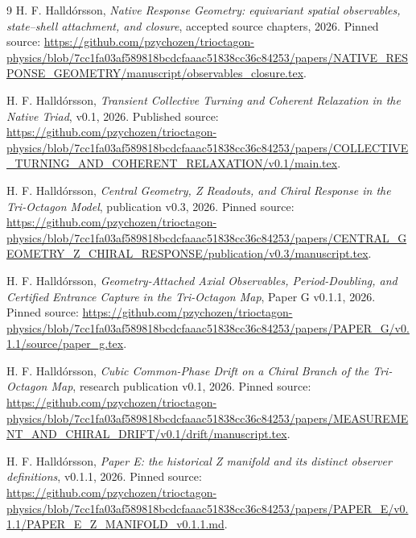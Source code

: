 \documentclass[11pt,a4paper]{article}
\numberwithin{equation}{section}
\theoremstyle{definition}
\theoremstyle{remark}
\begin{document}
\begin{thebibliography}{9}
\small
{}
H. F. Halldórsson, \emph{Native Response Geometry: equivariant spatial
observables, state--shell attachment, and closure}, accepted source chapters,
2026. Pinned source:
\url{https://github.com/pzychozen/trioctagon-physics/blob/7cc1fa03af589818bcdcfaaac51838cc36c84253/papers/NATIVE_RESPONSE_GEOMETRY/manuscript/observables_closure.tex}.

H. F. Halldórsson, \emph{Transient Collective Turning and Coherent
Relaxation in the Native Triad}, v0.1, 2026. Published source:
\url{https://github.com/pzychozen/trioctagon-physics/blob/7cc1fa03af589818bcdcfaaac51838cc36c84253/papers/COLLECTIVE_TURNING_AND_COHERENT_RELAXATION/v0.1/main.tex}.

H. F. Halldórsson, \emph{Central Geometry, Z Readouts, and Chiral Response
in the Tri-Octagon Model}, publication v0.3, 2026. Pinned source:
\url{https://github.com/pzychozen/trioctagon-physics/blob/7cc1fa03af589818bcdcfaaac51838cc36c84253/papers/CENTRAL_GEOMETRY_Z_CHIRAL_RESPONSE/publication/v0.3/manuscript.tex}.

H. F. Halldórsson, \emph{Geometry-Attached Axial Observables,
Period-Doubling, and Certified Entrance Capture in the Tri-Octagon Map},
Paper G v0.1.1, 2026. Pinned source:
\url{https://github.com/pzychozen/trioctagon-physics/blob/7cc1fa03af589818bcdcfaaac51838cc36c84253/papers/PAPER_G/v0.1.1/source/paper_g.tex}.

H. F. Halldórsson, \emph{Cubic Common-Phase Drift on a Chiral Branch of
the Tri-Octagon Map}, research publication v0.1, 2026. Pinned source:
\url{https://github.com/pzychozen/trioctagon-physics/blob/7cc1fa03af589818bcdcfaaac51838cc36c84253/papers/MEASUREMENT_AND_CHIRAL_DRIFT/v0.1/drift/manuscript.tex}.

H. F. Halldórsson, \emph{Paper E: the historical Z manifold and its
distinct observer definitions}, v0.1.1, 2026. Pinned source:
\url{https://github.com/pzychozen/trioctagon-physics/blob/7cc1fa03af589818bcdcfaaac51838cc36c84253/papers/PAPER_E/v0.1.1/PAPER_E_Z_MANIFOLD_v0.1.1.md}.
\end{thebibliography}
\end{document}
